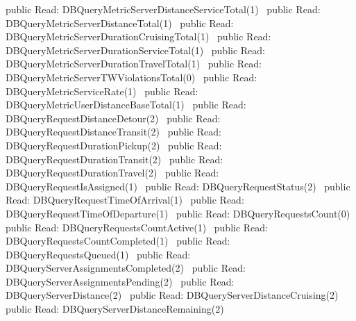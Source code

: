 public \LA{}Read: DBQueryMetricServerDistanceServiceTotal(1)~{\nwtagstyle{}}\RA{}
public \LA{}Read: DBQueryMetricServerDistanceTotal(1)~{\nwtagstyle{}}\RA{}
public \LA{}Read: DBQueryMetricServerDurationCruisingTotal(1)~{\nwtagstyle{}}\RA{}
public \LA{}Read: DBQueryMetricServerDurationServiceTotal(1)~{\nwtagstyle{}}\RA{}
public \LA{}Read: DBQueryMetricServerDurationTravelTotal(1)~{\nwtagstyle{}}\RA{}
public \LA{}Read: DBQueryMetricServerTWViolationsTotal(0)~{\nwtagstyle{}}\RA{}
public \LA{}Read: DBQueryMetricServiceRate(1)~{\nwtagstyle{}}\RA{}
public \LA{}Read: DBQueryMetricUserDistanceBaseTotal(1)~{\nwtagstyle{}}\RA{}
public \LA{}Read: DBQueryRequestDistanceDetour(2)~{\nwtagstyle{}}\RA{}
public \LA{}Read: DBQueryRequestDistanceTransit(2)~{\nwtagstyle{}}\RA{}
public \LA{}Read: DBQueryRequestDurationPickup(2)~{\nwtagstyle{}}\RA{}
public \LA{}Read: DBQueryRequestDurationTransit(2)~{\nwtagstyle{}}\RA{}
public \LA{}Read: DBQueryRequestDurationTravel(2)~{\nwtagstyle{}}\RA{}
public \LA{}Read: DBQueryRequestIsAssigned(1)~{\nwtagstyle{}}\RA{}
public \LA{}Read: DBQueryRequestStatus(2)~{\nwtagstyle{}}\RA{}
public \LA{}Read: DBQueryRequestTimeOfArrival(1)~{\nwtagstyle{}}\RA{}
public \LA{}Read: DBQueryRequestTimeOfDeparture(1)~{\nwtagstyle{}}\RA{}
public \LA{}Read: DBQueryRequestsCount(0)~{\nwtagstyle{}}\RA{}
public \LA{}Read: DBQueryRequestsCountActive(1)~{\nwtagstyle{}}\RA{}
public \LA{}Read: DBQueryRequestsCountCompleted(1)~{\nwtagstyle{}}\RA{}
public \LA{}Read: DBQueryRequestsQueued(1)~{\nwtagstyle{}}\RA{}
public \LA{}Read: DBQueryServerAssignmentsCompleted(2)~{\nwtagstyle{}}\RA{}
public \LA{}Read: DBQueryServerAssignmentsPending(2)~{\nwtagstyle{}}\RA{}
public \LA{}Read: DBQueryServerDistance(2)~{\nwtagstyle{}}\RA{}
public \LA{}Read: DBQueryServerDistanceCruising(2)~{\nwtagstyle{}}\RA{}
public \LA{}Read: DBQueryServerDistanceRemaining(2)~{\nwtagstyle{}}\RA{}
